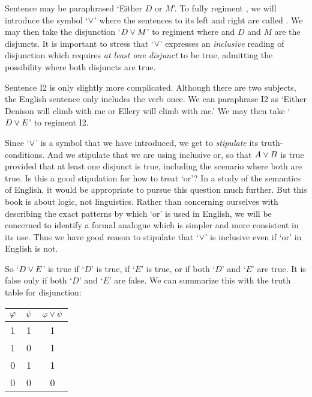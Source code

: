 Sentence  may be paraphrased `Either $D$ or $M$'.
To fully regiment , we will introduce the  symbol `$\vee$' where the sentences to its left and right are called .
We may then take the disjunction `$D \vee M$' to regiment  where and $D$ and $M$ are the disjuncts.
It is important to stress that `$\vee$' expresses an \emph{inclusive} reading of disjunction which requires \emph{at least one disjunct} to be true, admitting the possibility where both disjuncts are true.

Sentence I2 is only slightly more complicated.
Although there are two subjects, the English sentence only includes the verb once.
We can paraphrase I2 as `Either Denison will climb with me or Ellery will climb with me.'
We may then take `$D \vee E$' to regiment I2.


Since `$\vee$' is a symbol that we have introduced, we get to \textit{stipulate} its truth-conditions.
And we stipulate that we are using inclusive or, so that $A \vee B$ is true provided that at least one disjunct is true, including the scenario where both are true.
Is this a good stipulation for how to treat `or'?
In a study of the semantics of English, it would be appropriate to pursue this question much further.
But this book is about logic, not linguistics.
Rather than concerning ourselves with describing the exact patterns by which `or' is used in English, we will be concerned to identify a formal analogue which is simpler and more consistent in its use.
Thus we have good reason to stipulate that `$\vee$' is inclusive even if `or' in English is not. 

So `$D \vee E$' is true if `$D$' is true, if `$E$' is true, or if both `$D$' and `$E$' are true.
It is false only if both `$D$' and `$E$' are false.
We can summarize this with the truth table for disjunction:

\begin{center}
\begin{tabular}{c|c|c}
$\varphi$ & $\psi$ & $\varphi\vee\psi$ \\
\hline
1 & 1 & 1\\
1 & 0 & 1\\
0 & 1 & 1\\
0 & 0 & 0
\end{tabular}
\end{center}


